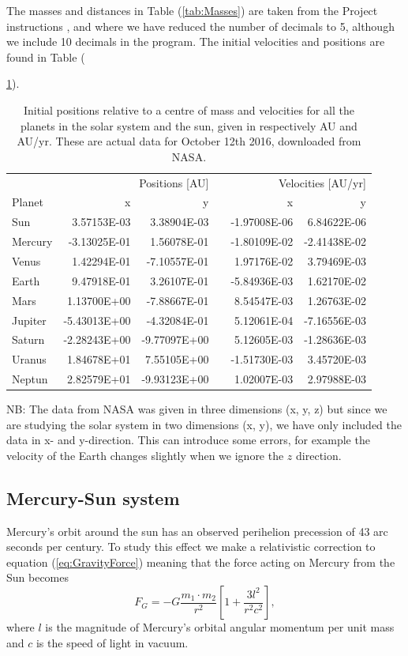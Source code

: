 \documentclass[norsk,a4paper,12pt]{article}
\begin{document}
The masses and distances in Table (\ref{tab:Masses}) are taken from the Project instructions \cite{Project_text}, and where we have reduced the number of decimals to 5, although we include 10 decimals in the program. The initial velocities and positions are found in Table ({\ref{tab:Positions}).
\begin{table}[H]
\centering
\caption{Initial positions relative to a centre of mass and velocities for all the planets in the solar system and the sun, given in respectively AU and AU/yr. These are actual data for October 12th 2016, downloaded from NASA.}
\label{tab:Positions}
\begin{tabularx}{\textwidth}{lrrrrr}
\toprule
\multicolumn{3}{r}{Positions [AU]} & \multicolumn{3}{r}{Velocities [AU/yr]} \\
\cline{2-3}
\cline{5-6}
Planet           & x & y &  & x & y \\
\midrule
Sun          & 3.57153E-03  & 3.38904E-03  & & -1.97008E-06 & 6.84622E-06  \\
Mercury      & -3.13025E-01 & 1.56078E-01  & & -1.80109E-02 & -2.41438E-02 \\
Venus        & 1.42294E-01  & -7.10557E-01 & & 1.97176E-02  & 3.79469E-03  \\
Earth        & 9.47918E-01  & 3.26107E-01  & & -5.84936E-03 & 1.62170E-02  \\
Mars         & 1.13700E+00  & -7.88667E-01 & & 8.54547E-03  & 1.26763E-02  \\
Jupiter      & -5.43013E+00 & -4.32084E-01 & & 5.12061E-04  & -7.16556E-03 \\
Saturn       & -2.28243E+00 & -9.77097E+00 & & 5.12605E-03  & -1.28636E-03 \\
Uranus 		 & 1.84678E+01  & 7.55105E+00  & & -1.51730E-03 & 3.45720E-03  \\
Neptun 		 & 2.82579E+01  & -9.93123E+00 & & 1.02007E-03  & 2.97988E-03  \\
\bottomrule
\end{tabularx}
\end{table}
NB: The data from NASA was given in three dimensions (x, y, z) but since we are studying the solar system in two dimensions (x, y), we have only included the data in x- and y-direction. This can introduce some errors, for example the velocity of the Earth changes slightly when we ignore the $z$ direction. \par\vspace{3mm}

\subsection{Mercury-Sun system}
Mercury's orbit around the sun has an observed perihelion precession of 43 arc seconds per century. To study this effect we make a relativistic correction to equation (\ref{eq:GravityForce}) meaning that the force acting on Mercury from the Sun becomes
\begin{equation}
F_G=-G\frac{m_1\cdot m_2}{r^2} \left[1 + \frac{3l^2}{r^2c^2}\right], 
\label{eq:GravitationalForceRelativistic}
\end{equation}
where $l$ is the magnitude of Mercury's orbital angular momentum per unit mass and $c$ is the speed of light in vacuum. 

}
\end{document}

